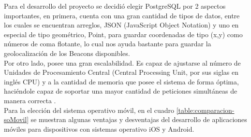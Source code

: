 Para el desarrollo del proyecto se decidió elegir PostgreSQL por 2 aspectos importantes, en primera, cuenta con una gran cantidad de tipos de datos, entre los cuales se encuentran arreglos, JSON (JavaScript Object Notation) y uno en especial de tipo geométrico, Point, para guardar coordenadas de tipo (x,y) como números de coma flotante, lo cual nos ayuda bastante para guardar la geolocalización de los Beacons disponibles.  \\

Por otro lado, posee una gran escalabilidad. Es capaz de ajustarse al número de Unidades de Procesamiento Central (Central Processing Unit, por sus siglas en inglés CPU) y a la cantidad de memoria que posee el sistema de forma óptima, haciéndole capaz de soportar una mayor cantidad de peticiones simultáneas de manera correcta \cite{SQL1}.  \\

Para la elección del sistema operativo móvil, en el cuadro \ref{table:comparacion-soMovil} se muestran algunas ventajas y desventajas del desarrollo de aplicaciones móviles para dispositivos con sistemas operativo iOS y Android.

